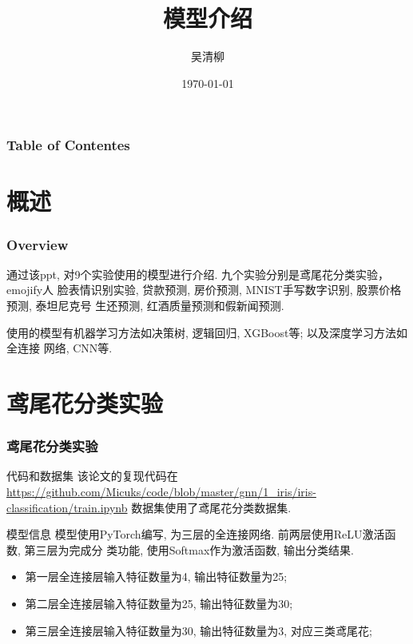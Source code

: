 \documentclass{beamer}
\title{模型介绍}
\author{吴清柳}
\institute{Beijing University of Posts and Telecommunications}
\date{\today}
\begin{document}
\AtBeginSection{\tableofcontents[currentsection]}
\maketitle

\begin{frame}[allowframebreaks]
	\frametitle{Table of Contentes}
	\tableofcontents
\end{frame}

\section{概述}
\begin{frame}
	\frametitle{Overview}
	通过该ppt, 对9个实验使用的模型进行介绍. 九个实验分别是鸢尾花分类实验，emojify人
	脸表情识别实验, 贷款预测, 房价预测, MNIST手写数字识别, 股票价格预测, 泰坦尼克号
	生还预测, 红酒质量预测和假新闻预测.

	使用的模型有机器学习方法如决策树, 逻辑回归, XGBoost等; 以及深度学习方法如全连接
	网络, CNN等.
\end{frame}

\section{鸢尾花分类实验}
\begin{frame}[fragile]
	\frametitle{鸢尾花分类实验}
	\begin{block}{代码和数据集}
		该论文的复现代码在\href{这里}{https://github.com/Micuks/code/blob/master/gnn/1\_iris/iris-classification/train.ipynb}
		数据集使用了鸢尾花分类数据集.
	\end{block}

	\begin{block}{模型信息}
		模型使用PyTorch编写, 为三层的全连接网络. 前两层使用ReLU激活函数, 第三层为完成分
		类功能, 使用Softmax作为激活函数, 输出分类结果.
		\begin{itemize}
			\item 第一层全连接层输入特征数量为4, 输出特征数量为25;
			\item 第二层全连接层输入特征数量为25, 输出特征数量为30;
			\item 第三层全连接层输入特征数量为30, 输出特征数量为3, 对应三类鸢尾花;
		\end{itemize}
	\end{block}
\end{frame}
\end{document}
